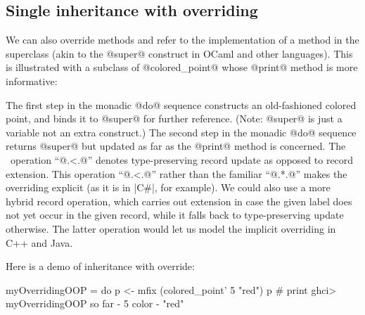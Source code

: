 
\medskip

\subsection{Single inheritance with overriding}

We can also override methods and refer to the implementation of a
method in the superclass (akin to the @super@ construct in OCaml and
other languages). This is illustrated with a subclass of
@colored_point@ whose @print@ method is more informative:

\noindent
The first step in the monadic @do@ sequence constructs an
old-fashioned colored point, and binds it to @super@ for further
reference. (Note: @super@ is just a variable not an extra construct.) 
The second step in the monadic @do@ sequence returns @super@ but
updated as far as the @print@ method is concerned. The \HList\
operation ``@.<.@'' denotes type-preserving record update as opposed
to record extension. This operation ``@.<.@'' rather than the familiar
``@.*.@'' makes the overriding explicit (as it is in |C#|, for
example). We could also use a more hybrid record operation, which
carries out extension in case the given label does not yet occur in
the given record, while it falls back to type-preserving update
otherwise. The latter operation would let us model the implicit
overriding in C++ and Java.

Here is a demo of inheritance with override:

\begin{code}
 myOverridingOOP =
   do
      p  <- mfix (colored_point' 5 "red")
      p  # print
 ghci> myOverridingOOP
 so far - 5
 color  - "red"
\end{code}

